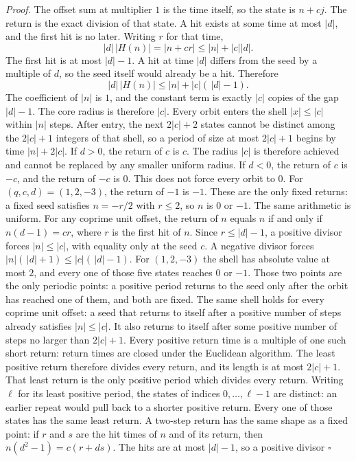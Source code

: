 \documentclass[11pt,letterpaper]{article}
\newenvironment{proof}{\noindent\textit{Proof.}}{\hfill\(\square\)}
\begin{document}
\begin{proof}
The offset sum at multiplier \(1\) is the time itself, so the state is \(n+cj\). The return is the exact division of that state. A hit exists at some time at most \(\lvert d\rvert\), and the first hit is no later. Writing \(r\) for that time,
\[
\lvert d\rvert\,\lvert H(n)\rvert=\lvert n+cr\rvert\le \lvert n\rvert+\lvert c\rvert\lvert d\rvert.
\]
The first hit is at most \(\lvert d\rvert-1\). A hit at time \(\lvert d\rvert\) differs from the seed by a multiple of \(d\), so the seed itself would already be a hit. Therefore
\[
\lvert d\rvert\,\lvert H(n)\rvert\le \lvert n\rvert+\lvert c\rvert(\,\lvert d\rvert-1).
\]
The coefficient of \(\lvert n\rvert\) is \(1\), and the constant term is exactly \(\lvert c\rvert\) copies of the gap \(\lvert d\rvert-1\). The core radius is therefore \(\lvert c\rvert\). Every orbit enters the shell \(\lvert x\rvert\le \lvert c\rvert\) within \(\lvert n\rvert\) steps. After entry, the next \(2\lvert c\rvert+2\) states cannot be distinct among the \(2\lvert c\rvert+1\) integers of that shell, so a period of size at most \(2\lvert c\rvert+1\) begins by time \(\lvert n\rvert+2\lvert c\rvert\). If \(d>0\), the return of \(c\) is \(c\). The radius \(\lvert c\rvert\) is therefore achieved and cannot be replaced by any smaller uniform radius. If \(d<0\), the return of \(c\) is \(-c\), and the return of \(-c\) is \(0\). This does not force every orbit to \(0\). For \((q,c,d)=(1,2,-3)\), the return of \(-1\) is \(-1\). These are the only fixed returns: a fixed seed satisfies \(n=-r/2\) with \(r\le 2\), so \(n\) is \(0\) or \(-1\). The same arithmetic is uniform. For any coprime unit offset, the return of \(n\) equals \(n\) if and only if \(n(d-1)=cr\), where \(r\) is the first hit of \(n\). Since \(r\le\lvert d\rvert-1\), a positive divisor forces \(\lvert n\rvert\le\lvert c\rvert\), with equality only at the seed \(c\). A negative divisor forces \(\lvert n\rvert(\,\lvert d\rvert+1)\le\lvert c\rvert(\,\lvert d\rvert-1)\). For \((1,2,-3)\) the shell has absolute value at most \(2\), and every one of those five states reaches \(0\) or \(-1\). Those two points are the only periodic points: a positive period returns to the seed only after the orbit has reached one of them, and both are fixed. The same shell holds for every coprime unit offset: a seed that returns to itself after a positive number of steps already satisfies \(\lvert n\rvert\le\lvert c\rvert\). It also returns to itself after some positive number of steps no larger than \(2\lvert c\rvert+1\). Every positive return time is a multiple of one such short return: return times are closed under the Euclidean algorithm. The least positive return therefore divides every return, and its length is at most \(2\lvert c\rvert+1\). That least return is the only positive period which divides every return. Writing \(\ell\) for its least positive period, the states of indices \(0,\ldots,\ell-1\) are distinct: an earlier repeat would pull back to a shorter positive return. Every one of those states has the same least return. A two-step return has the same shape as a fixed point: if \(r\) and \(s\) are the hit times of \(n\) and of its return, then \(n(d^{2}-1)=c(r+ds)\). The hits are at most \(\lvert d\rvert-1\), so a positive divisor 
\end{proof}
\end{document}
